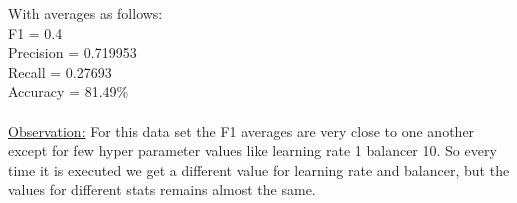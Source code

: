\begin{enumerate}
\hspace*{2mm}With averages as follows:\\
\hspace*{4mm}F1 = 0.4\\
\hspace*{4mm}Precision = 0.719953\\
\hspace*{4mm}Recall = 0.27693\\
\hspace*{4mm}Accuracy = 81.49\%\\\\
\underline{Observation:} For this data set the F1 averages are very close to one another except for few hyper parameter values like learning rate 1 balancer 10. So every time it is executed we get a different value for learning rate and balancer, but the values for different stats remains almost the same.
\end{enumerate}




